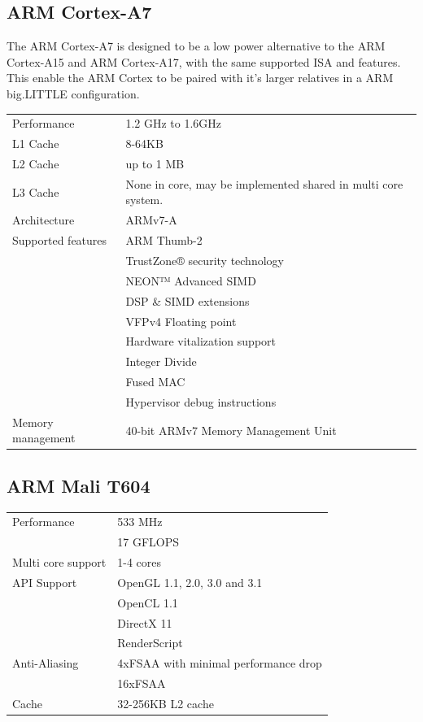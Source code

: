 \subsection{ARM Cortex-A7}
The ARM Cortex-A7 is designed to be a low power alternative to the ARM Cortex-A15 and ARM Cortex-A17, with the same supported ISA and features.
This enable the ARM Cortex to be paired with it's larger relatives in a ARM big.LITTLE configuration.
\begin{table}[H]
  \begin{tabular}{ll}
    Performance       & 1.2 GHz to 1.6GHz  \\
    L1 Cache          & 8-64KB \\
    L2 Cache          & up to 1 MB \\
    L3 Cache          & None in core, may be implemented shared in multi core system. \\
    Architecture      & ARMv7-A            \\
    Supported features& ARM Thumb-2 \\
                      & TrustZone® security technology \\
                      & NEON™ Advanced SIMD \\
                      & DSP \& SIMD extensions \\
                      & VFPv4 Floating point \\
                      & Hardware vitalization support \\
                      & Integer Divide \\
                      & Fused MAC \\
                      & Hypervisor debug instructions \\
    Memory management & 40-bit ARMv7 Memory Management Unit
  \end{tabular}
\end{table}
\subsection{ARM Mali T604}
\begin{table}[H]
  \begin{tabular}{ll}
    Performance       & 533 MHz\\
                      & 17 GFLOPS  \\
    Multi core support & 1-4 cores  \\
    API Support       & OpenGL 1.1, 2.0, 3.0 and 3.1  \\
                      & OpenCL 1.1  \\
                      & DirectX 11  \\
                      & RenderScript \\
    Anti-Aliasing     & 4xFSAA with minimal performance drop  \\
                      & 16xFSAA  \\
    Cache             & 32-256KB L2 cache
  \end{tabular}
\end{table}
